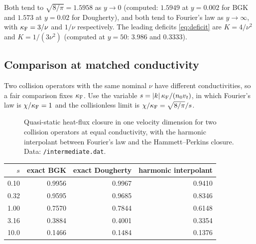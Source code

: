 Both tend to $\sqrt{8/\pi}=1.5958$ as $y\to0$ (computed: $1.5949$ at
$y=0.002$ for BGK and $1.573$ at $y=0.02$ for Dougherty), and both tend to
Fourier's law as $y\to\infty$, with $\kappa_{\mathrm F}=3/\nu$ and $1/\nu$ respectively.
The leading deficits \eqref{eq:deficit} are $K=4/\nu^2$ and
$K=1/(3\nu^2)$ (computed at $y=50$: $3.986$ and $0.3333$).

\subsection{Comparison at matched conductivity}

Two collision operators with the same nominal $\nu$ have different
conductivities, so a fair comparison fixes $\kappa_{\mathrm F}$. Use the variable
$s=|k|\,\kappa_{\mathrm F}/(n_0v_t)$, in which Fourier's law is $\chi/\kappa_{\mathrm F}=1$ and the
collisionless limit is $\chi/\kappa_{\mathrm F}=\sqrt{8/\pi}/s$.

\begin{figure}[ht]
\centering
{}
\caption{Quasi-static heat-flux closure in one velocity dimension for two
collision operators at equal conductivity, with the harmonic interpolant
between Fourier's law and the Hammett--Perkins closure. Data:
\texttt{\rundir/intermediate.dat}.}
\label{fig:between}
\end{figure}

\begin{center}
\begin{tabular}{rrrr}
\toprule
$s$ & exact BGK & exact Dougherty & harmonic interpolant \\
\midrule
0.10 & 0.9956 & 0.9967 & 0.9410 \\
0.32 & 0.9595 & 0.9685 & 0.8346 \\
1.00 & 0.7570 & 0.7844 & 0.6148 \\
3.16 & 0.3884 & 0.4001 & 0.3354 \\
10.0 & 0.1466 & 0.1484 & 0.1376 \\
\bottomrule
\end{tabular}
\end{center}

